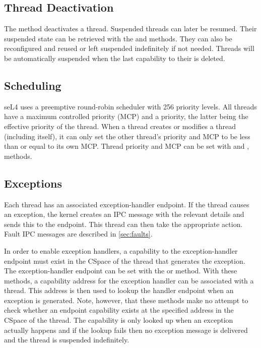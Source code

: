 \subsection{Thread Deactivation}
\label{sec:thread_deactivation}

The  method deactivates a thread.
Suspended threads can later be resumed.
Their suspended state can be retrieved with the 
 and
 methods.
They can also be reconfigured and
reused or left suspended indefinitely if not needed. Threads will be
automatically suspended when the last capability to their  is
deleted.

\subsection{Scheduling}
\label{sec:sched}

seL4 uses a preemptive round-robin scheduler with 256 priority levels.
All threads have a maximum controlled priority (MCP) and a priority, the latter being the effective
priority of the thread.
When a thread creates or modifies a thread (including itself), it can only set the
other thread's priority and MCP to be less than or equal to its own MCP. Thread priority and MCP can be
set with  and
,  methods.

\subsection{Exceptions}

Each thread has an associated exception-handler endpoint. If the thread
causes an exception, the kernel creates an IPC message with the relevant
details and sends this to the endpoint. This
thread can then take the appropriate action. Fault IPC messages are
described in \autoref{sec:faults}.

In order to enable exception handlers, a capability to the exception-handler
endpoint must exist in the CSpace of the thread that generates the exception.
The exception-handler
endpoint can be set with the  or
 method.
With these methods, a capability address for the exception handler can be associated with a thread.
This address is then used to lookup the handler endpoint when an exception is generated.
Note, however, that these methods make no attempt to check whether an endpoint capability exists at the specified
address in the CSpace of the thread. The capability is only looked up
when an exception actually happens and if the lookup fails then no
exception message is delivered and the thread is suspended indefinitely.

